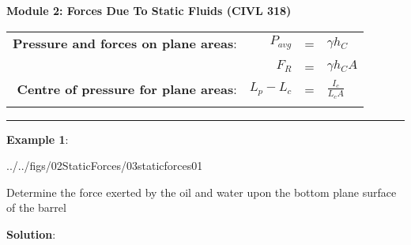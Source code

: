 \documentclass[10pt,onesided]{amsart}
\begin{document}
\thispagestyle{empty}
\vspace{-7cm}
\centering

\textbf{\Large Module 2: Forces Due To Static Fluids (CIVL 318)}
\parb
\begin{center}
	\begin{tabular}{rrcl}
		\toprule
		\addlinespace
		\textbf{Pressure and forces on plane areas}: & $P_{avg}$ & = & $\gamma{h_C}$      \\
		\addlinespace
		                                             & $F_R$     & = & $\gamma{h_C}A$     \\
		\addlinespace
		\midrule
		\addlinespace
		\textbf{Centre of pressure for plane areas}: & $L_p-L_c$ & = & $\frac{I_c}{L_cA}$ \\
		\addlinespace
		\bottomrule
	\end{tabular}
\end{center}



\rule{\columnwidth}{0.02in}
\parb

\begin{minipage}[t]{0.35\columnwidth}
	\raggedright
	\textbf{Example 1}:
	\begin{cfig}[0.4]{../../figs/02StaticForces/03staticforces01}\end{cfig}
	Determine the force exerted by the oil and water upon the bottom plane surface of the barrel
\end{minipage}
\hfill
\begin{minipage}[t]{0.55\columnwidth}
	\textbf{Solution}:
	\parb{}
	\Large
\end{minipage}
\end{document}
